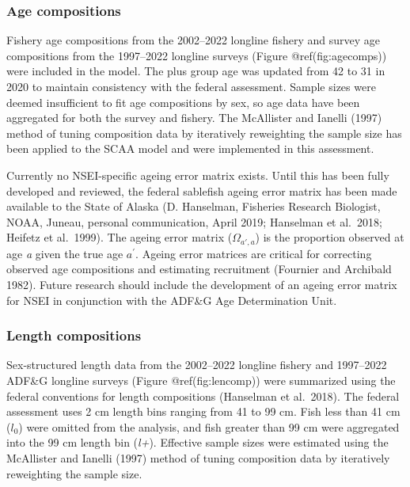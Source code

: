 \documentclass[
]{article}
\begin{document}
\hypertarget{age-compositions}{%
\subsubsection{Age compositions}\label{age-compositions}}

Fishery age compositions from the 2002--2022 longline fishery and survey
age compositions from the 1997--2022 longline surveys (Figure
@ref(fig:agecomps)) were included in the model. The plus group age was
updated from 42 to 31 in 2020 to maintain consistency with the federal
assessment. Sample sizes were deemed insufficient to fit age
compositions by sex, so age data have been aggregated for both the
survey and fishery. The McAllister and Ianelli (1997) method of tuning
composition data by iteratively reweighting the sample size has been
applied to the SCAA model and were implemented in this assessment.

Currently no NSEI-specific ageing error matrix exists. Until this has
been fully developed and reviewed, the federal sablefish ageing error
matrix has been made available to the State of Alaska (D. Hanselman,
Fisheries Research Biologist, NOAA, Juneau, personal communication,
April 2019; Hanselman et al.~2018; Heifetz et al.~1999). The ageing
error matrix (\(\Omega_{a',a}\)) is the proportion observed at age
\emph{a} given the true age \({a}^{'}\). Ageing error matrices are
critical for correcting observed age compositions and estimating
recruitment (Fournier and Archibald 1982). Future research should
include the development of an ageing error matrix for NSEI in
conjunction with the ADF\&G Age Determination Unit.

\hypertarget{length-compositions}{%
\subsubsection{Length compositions}\label{length-compositions}}

Sex-structured length data from the 2002--2022 longline fishery and
1997--2022 ADF\&G longline surveys (Figure @ref(fig:lencomp)) were
summarized using the federal conventions for length compositions
(Hanselman et al.~2018). The federal assessment uses 2 cm length bins
ranging from 41 to 99 cm. Fish less than 41 cm (\emph{\(l_0\)}) were
omitted from the analysis, and fish greater than 99 cm were aggregated
into the 99 cm length bin (\emph{l+}). Effective sample sizes were
estimated using the McAllister and Ianelli (1997) method of tuning
composition data by iteratively reweighting the sample size.
\end{document}
